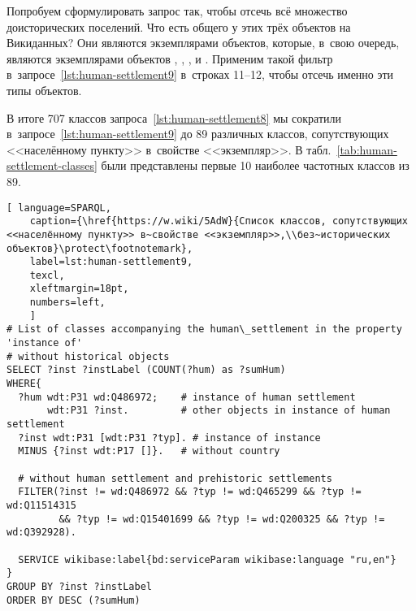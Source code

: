 Попробуем сформулировать запрос так, чтобы отсечь всё множество доисторических поселений.  
Что есть общего у этих трёх объектов на Викиданных? 
Они являются экземплярами объектов, которые, в~свою очередь, 
являются экземплярами объектов , 
, 
, 
и . 
Применим такой фильтр в~запросе~\ref{lst:human-settlement9} в~строках 11--12, 
чтобы отсечь именно эти типы объектов.

В итоге 707 классов запроса~\ref{lst:human-settlement8} 
мы сократили в~запросе~\ref{lst:human-settlement9} 
до 89 различных классов, сопутствующих <<населённому пункту>> в~свойстве <<экземпляр>>. 
В табл.~\ref{tab:human-settlement-classes} были представлены 
первые 10 наиболее частотных классов из 89. 



\newpage
\lstset{numbers=left, firstnumber=1, frame=single}
\begin{lstlisting}[ language=SPARQL, 
    caption={\href{https://w.wiki/5AdW}{Cписок классов, сопутствующих <<населённому пункту>> в~свойстве <<экземпляр>>,\\без~исторических объектов}\protect\footnotemark},
    label=lst:human-settlement9,
    texcl,
    xleftmargin=18pt, 
    numbers=left,
    ]
# List of classes accompanying the human\_settlement in the property 'instance of' 
# without historical objects 
SELECT ?inst ?instLabel (COUNT(?hum) as ?sumHum)
WHERE{
  ?hum wdt:P31 wd:Q486972;    # instance of human settlement
       wdt:P31 ?inst.         # other objects in instance of human settlement
  ?inst wdt:P31 [wdt:P31 ?typ]. # instance of instance
  MINUS {?inst wdt:P17 []}.   # without country

  # without human settlement and prehistoric settlements
  FILTER(?inst != wd:Q486972 && ?typ != wd:Q465299 && ?typ != wd:Q11514315 
         && ?typ != wd:Q15401699 && ?typ != wd:Q200325 && ?typ != wd:Q392928). 

  SERVICE wikibase:label{bd:serviceParam wikibase:language "ru,en"}
}
GROUP BY ?inst ?instLabel
ORDER BY DESC (?sumHum)
\end{lstlisting}%




